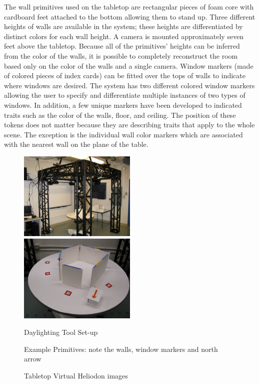 The wall primitives used on the tabletop are rectangular pieces of foam core with cardboard feet attached to the bottom allowing them to stand up.  Three different heights of walls are available in the system; these heights are differentiated by distinct colors for each wall height.  A camera is mounted approximately seven feet above the tabletop. Because all of the primitives' heights can be inferred from the color of the walls, it is possible to completely reconstruct the room based only on the color of the walls and a single camera.  Window markers (made of colored pieces of index cards) can be fitted over the tops of walls to indicate where windows are desired.  The system has two different colored window markers allowing the user to specify and differentiate multiple instances of two types of windows.  In addition, a few unique markers have been developed to indicated traits such as the color of the walls, floor, and ceiling.  The position of these tokens does not matter because they are describing traits that apply to the whole scene.  The exception is the individual wall color markers which are associated with the nearest wall on the plane of the table.
\begin{figure}[t]
\includegraphics[width=0.5\textwidth]{images/IMG_1316.png}
\includegraphics[width=0.5\textwidth]{images/IMG_1318.png}
\vspace{0.1in}\\
\begin{minipage}{0.5\textwidth}\vspace{-0.25in} \begin{center} Daylighting Tool Set-up \end{center}\end{minipage}%
\begin{minipage}{0.5\textwidth}\vspace{-0.25in} \begin{center} Example Primitives: note the walls, window markers and north arrow \end{center}\end{minipage}%
\vspace{-0.1in}
\caption{Tabletop Virtual Heliodon images}

\end{figure}










